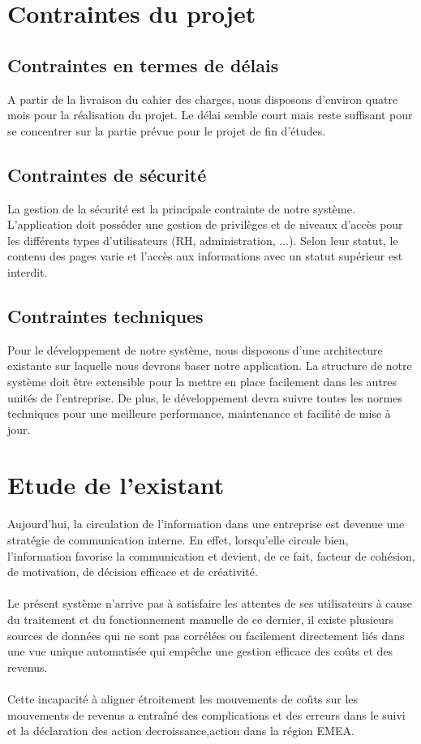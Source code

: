 \section{Contraintes du projet}

\subsection{Contraintes en termes de délais}
A partir de la livraison du cahier des charges, nous disposons d’environ quatre mois pour la réalisation du projet. Le délai semble court mais reste suffisant pour se concentrer sur la partie prévue pour le projet de fin d’études.

\subsection{Contraintes de sécurité}
La gestion de la sécurité est la principale contrainte de notre système. L'application doit posséder une gestion de privilèges et de niveaux d'accès pour les différents types d'utilisateurs (RH, administration, ...). Selon leur statut, le contenu des pages varie et l'accès aux informations avec un statut supérieur est interdit.

\subsection{Contraintes techniques}

Pour le développement de notre système, nous disposons d’une architecture
existante sur laquelle nous devrons baser notre application. La structure de notre système doit être extensible pour la mettre en place facilement dans les autres unités de l’entreprise. De plus, le développement devra suivre toutes les normes techniques pour une meilleure performance, maintenance et facilité de mise à jour.

\section{Etude de l'existant}

Aujourd’hui, la circulation de l’information dans une entreprise est devenue une stratégie de communication interne. En effet, lorsqu’elle circule bien, l’information favorise la communication et devient, de ce fait, facteur de cohésion, de motivation, de décision efficace et de créativité.
\\\\
Le présent système n’arrive pas à satisfaire les attentes de ses utilisateurs à cause du traitement et du fonctionnement manuelle de ce dernier, il existe plusieurs sources de données qui ne sont pas corrélées ou facilement directement liés dans une vue unique automatisée qui empêche une gestion efficace des coûts et des revenus.
\\\\
Cette incapacité à aligner étroitement les mouvements de coûts sur les mouvements de revenus a entraîné des complications et des erreurs dans le suivi et la déclaration des
action decroissance,action dans la région EMEA.
\\

